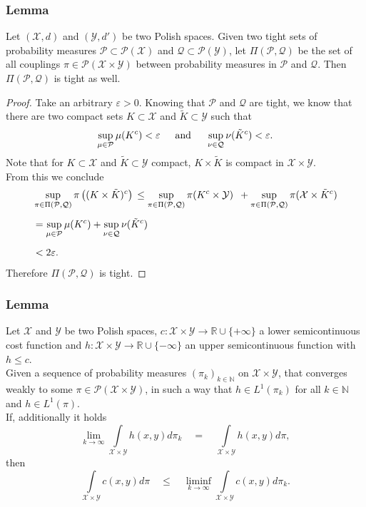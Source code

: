 \documentclass[11pt,a4paper]{article}
\begin{document}
\subsubsection{Lemma}
Let $(\mathcal{X},d)$ and $(\mathcal{Y},d')$ be two Polish spaces. Given two tight sets of probability measures $\mathcal{P}\subset{}\mathcal{P(X)}$ and $\mathcal{Q}\subset\mathcal{P(Y)}$, let $\Pi(\mathcal{P},\mathcal{Q})$ be the set of all couplings $\pi\in\mathcal{P(X\times{}Y)}$ between probability measures in $\mathcal{P}$ and $\mathcal{Q}$. Then $\Pi(\mathcal{P},\mathcal{Q})$ is tight as well.
\begin{proof}
Take an arbitrary $\varepsilon>0$. Knowing that $\mathcal{P}$ and $\mathcal{Q}$ are tight, we know that there are two compact sets $K\subset\mathcal{X}$ and $\tilde{K}\subset\mathcal{Y}$ such that 
\begin{align*}
\sup\limits_{\mu\in\mathcal{P}}\mu(K^c)<\varepsilon \hspace{1.5em}\text{and}\hspace{1.5em} \sup\limits_{\nu\in\mathcal{Q}}\nu(\tilde{K}^c)<\varepsilon.
\end{align*}
Note that for $K\subset\mathcal{X}$ and $\tilde{K}\subset\mathcal{Y}$ compact, $K\times\tilde{K}$ is compact in $\mathcal{X\times{}Y}$.\\
From this we conclude
\begin{align*}
&\sup\limits_{{\small \pi\in\Pi(\mathcal{P},\mathcal{Q})}}\pi\left((K\times\tilde{K})^c\right) \,\leq \sup\limits_{\pi\in\Pi(\mathcal{P},\mathcal{Q})}\pi(K^c\times\mathcal{Y}) \,\,\,+ \sup\limits_{\pi\in\Pi(\mathcal{P},\mathcal{Q})}\pi(\mathcal{X}\times\tilde{K}^c) \\[5pt]&= \sup\limits_{\mu\in\mathcal{P}}\mu(K^c) + \sup\limits_{\nu\in\mathcal{Q}}\nu(\tilde{K}^c) \\[5pt]&< 2\varepsilon.
\end{align*}
Therefore $\Pi(\mathcal{P},\mathcal{Q})$ is tight.
\end{proof}
\subsubsection{Lemma}
Let $\mathcal{X}$ and $\mathcal{Y}$ be two Polish spaces, $c:\mathcal{X\times{}Y}\rightarrow\mathbb{R}\cup\{+\infty\}$ a lower semicontinuous cost function and $h:\mathcal{X\times{}Y}\rightarrow\mathbb{R}\cup\{-\infty\}$ an upper semicontinuous function with $h\leq{}c.$\vspace{0.5em}\\ Given a sequence of probability measures $(\pi_k)_{k\in\mathbb{N}}$ on $\mathcal{X\times{}Y}$, that converges weakly to some $\pi\in\mathcal{P(X\times{}Y)}$, in such a way that $h\in{}L^1(\pi_k)$ for all $k\in\mathbb{N}$ and $h\in{}L^1(\pi)$.\vspace{1em}\\ If, additionally it holds
\[
\lim\limits_{k\rightarrow\infty}\int\limits_{\mathcal{X\times{}Y}}h(x,y)d\pi_k \quad = \quad \int\limits_{\mathcal{X\times{}Y}}h(x,y)d\pi,
\]
then
\[
\int\limits_{\mathcal{X\times{}Y}}c(x,y)d\pi \quad\leq\quad \liminf\limits_{k\rightarrow\infty}\int\limits_{\mathcal{X\times{}Y}}c(x,y)d\pi_k.
\]
\end{document}
